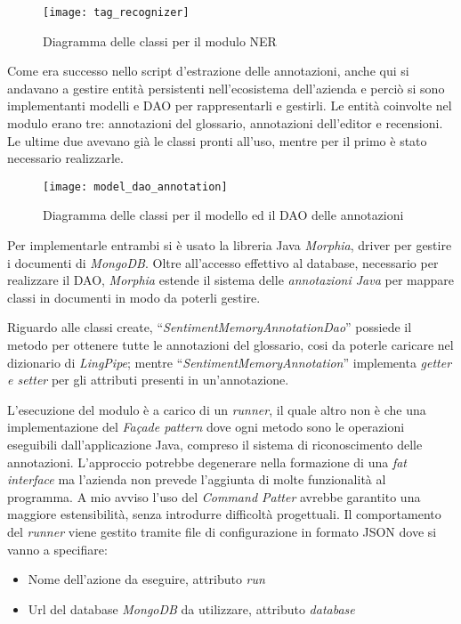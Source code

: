 \begin{figure}[H]
\begin{center}
\texttt{[image: tag\_recognizer]}
\caption{
Diagramma delle classi per il modulo NER
}
\label{fig:tag_recognizer}
\end{center}
\end{figure}

Come era successo nello \gls{script} d'estrazione delle annotazioni, anche qui
si andavano a gestire entità persistenti nell'ecosistema dell'azienda e perciò
si sono implementanti modelli e \gls{DAO} per rappresentarli e gestirli. Le
entità coinvolte nel modulo erano tre: annotazioni del glossario, annotazioni
dell'editor e recensioni. Le ultime due avevano già le classi pronti all'uso,
mentre per il primo è stato necessario realizzarle.

\begin{figure}[H]
\begin{center}
\texttt{[image: model\_dao\_annotation]}
\caption{
Diagramma delle classi per il modello ed il DAO delle annotazioni
}
\label{fig:model_dao_annotation}
\end{center}
\end{figure}

Per implementarle entrambi si è usato la libreria Java \textit{Morphia}, driver
per gestire i documenti di \textit{MongoDB}. Oltre all'accesso effettivo al
database, necessario per realizzare il \gls{DAO}, \textit{Morphia} estende il
sistema delle \textit{annotazioni Java} per mappare classi in documenti in modo
da poterli gestire. 

Riguardo alle classi create, ``\textit{SentimentMemoryAnnotationDao}'' possiede
il metodo per ottenere tutte le annotazioni del glossario, cosi da poterle
caricare nel dizionario di \textit{LingPipe}; mentre
``\textit{SentimentMemoryAnnotation}'' implementa \textit{getter e setter} per
gli attributi presenti in un'annotazione.

L'esecuzione del modulo è a carico di un \textit{runner}, il quale 
altro non è che una implementazione del \textit{Façade pattern} dove ogni 
metodo sono le operazioni eseguibili dall'applicazione Java, compreso il 
sistema di riconoscimento delle annotazioni. L'approccio potrebbe degenerare
nella formazione di una \textit{fat interface} ma l'azienda non prevede 
l'aggiunta di molte funzionalità al programma. A mio avviso l'uso del
\textit{Command Patter} avrebbe garantito una maggiore estensibilità, senza
introdurre difficoltà progettuali. Il comportamento del \textit{runner} viene
gestito tramite file di configurazione in formato \gls{JSON} dove si vanno a
specifiare:
\begin{itemize}
\item Nome dell'azione da eseguire, attributo \textit{run}
\item Url del database \textit{MongoDB} da utilizzare, attributo
\textit{database}
\end{itemize}

